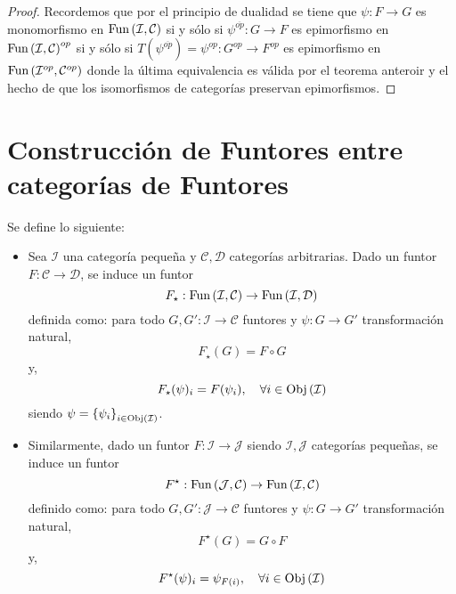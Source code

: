\documentclass[12pt]{report}
\theoremstyle{largebreak}
\newcommand\cf[3]{\ensuremath{#1:#2\rightarrow#3}}
\newcommand{\Obj}[1]{\ensuremath{\textup{Obj}\left(#1\right)}}
\newcommand{\Fun}[2]{\ensuremath{\textup{Fun}\left(#1,#2\right)}}
\begin{document}
    \begin{proof}
        Recordemos que por el principio de dualidad se tiene que $\cf{\psi}{F}{G}$ es monomorfismo en $\Fun{\mathcal{I}}{\mathcal{C}}$ si y sólo si $\cf{\psi^{\overline{op}}}{G}{F}$ es epimorfismo en $\Fun{\mathcal{I}}{\mathcal{C}}^{op}$ si y sólo si $\cf{T(\psi^{\overline{op}})=\psi^{op}}{G^{op}}{F^{op}}$ es epimorfismo en $\Fun{\mathcal{I}^{op}}{\mathcal{C}^{op}}$ donde la última equivalencia es válida por el teorema anteroir y el hecho de que los isomorfismos de categorías preservan epimorfismos.
    \end{proof}

    \section{Construcción de Funtores entre categorías de Funtores}

    \begin{mydef}
        Se define lo siguiente:
        \begin{itemize}
            \item Sea $\mathcal{I}$ una categoría pequeña y $\mathcal{C},\mathcal{D}$ categorías arbitrarias. Dado un funtor $\cf{F}{\mathcal{C}}{\mathcal{D}}$, se induce un funtor
            \begin{equation*}
                \cf{F_{\star}}{\Fun{\mathcal{I}}{\mathcal{C}}}{\Fun{\mathcal{I}}{\mathcal{D}}}
            \end{equation*}
            definida como: para todo $\cf{G,G'}{\mathcal{I}}{\mathcal{C}}$ funtores y $\cf{\psi}{G}{G'}$ transformación natural,
            \begin{equation*}
                F_\star(G)=F\circ G
            \end{equation*}
            y,
            \begin{equation*}
                F_\star(\psi)_i=F(\psi_i),\quad\forall i\in\Obj{\mathcal{I}}
            \end{equation*}
            siendo $\psi=\left\{\psi_i \right\}_{ i\in\Obj{\mathcal{I}}}$.
            \item Similarmente, dado un funtor $\cf{F}{\mathcal{I}}{\mathcal{J}}$ siendo $\mathcal{I},\mathcal{J}$ categorías pequeñas, se induce un funtor
            \begin{equation*}
                \cf{F^\star}{\Fun{\mathcal{J}}{\mathcal{C}}}{\Fun{\mathcal{I}}{\mathcal{C}}}
            \end{equation*}
            definido como: para todo $\cf{G,G'}{\mathcal{J}}{\mathcal{C}}$ funtores y $\cf{\psi}{G}{G'}$ transformación natural,
            \begin{equation*}
                F^\star(G)=G\circ F
            \end{equation*}
            y,
            \begin{equation*}
                F^\star(\psi)_i=\psi_{ F(i)},\quad\forall i\in\Obj{\mathcal{I}}
            \end{equation*}
        \end{itemize}
    \end{mydef}
\end{document}
